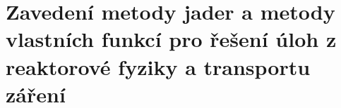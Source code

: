 \section[Metody jader a vlastních funkcí]{Zavedení metody jader a metody vlastních funkcí pro řešení úloh z reaktorové fyziky a transportu záření}